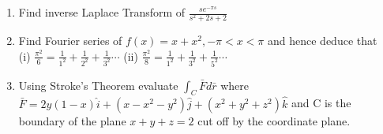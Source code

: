 \documentclass[17pt]{extarticle}
\begin{document}
\begin{enumerate}
    \item Find inverse Laplace Transform of $ \frac{se^{-\pi s}}{s^2+2s+2}$
    \item Find Fourier series of $ f(x) = x + x^2, -\pi<x<\pi $ and hence deduce that \\ 
    (i) $ \frac{\pi^2}{6}=\frac{1}{1^2}+\frac{1}{2^2}+\frac{1}{3^2}  \cdots $ (ii) $ \frac{\pi^2}{8}=\frac{1}{1^2}+\frac{1}{3^2}+\frac{1}{5^2}  \cdots $
    
    \item Using Stroke's Theorem evaluate $ \int_C \bar{F}d\bar{r} $ where $ \bar{F} = 2y(1-x) \hat{i} + (x-x^2-y^2) \hat{j} + (x^2+y^2+z^2) \hat{k} $ and C is the boundary of the plane $ x + y + z = 2 $ cut off by the coordinate plane.
    
    
    
\end{enumerate}
\end{document}
